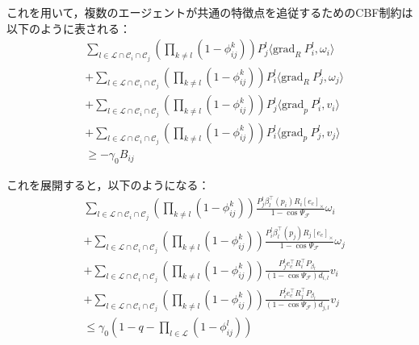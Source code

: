これを用いて，複数のエージェントが共通の特徴点を追従するためのCBF制約は以下のように表される：
\begin{equation}
\begin{aligned}
&\sum_{l \in \mathcal{L} \cap \mathcal{C}_i \cap \mathcal{C}_j}\left(\prod_{k \neq l}(1 - \phi_{ij}^k)\right)P_j^l \langle \mathrm{grad}_R\:P_i^l, \omega_i \rangle \\
&+ \sum_{l \in \mathcal{L} \cap \mathcal{C}_i \cap \mathcal{C}_j}\left(\prod_{k \neq l}(1 - \phi_{ij}^k)\right)P_i^l \langle \mathrm{grad}_R\:P_j^l, \omega_j \rangle \\
&+ \sum_{l \in \mathcal{L} \cap \mathcal{C}_i \cap \mathcal{C}_j}\left(\prod_{k \neq l}(1 - \phi_{ij}^k)\right)P_j^l \langle \mathrm{grad}_p\:P_i^l, v_i \rangle \\
&+ \sum_{l \in \mathcal{L} \cap \mathcal{C}_i \cap \mathcal{C}_j}\left(\prod_{k \neq l}(1 - \phi_{ij}^k)\right)P_i^l \langle \mathrm{grad}_p\:P_j^l, v_j \rangle \\
&\geq -\gamma_0 B_{ij}
\label{eq:common_cbf_constraint}
\end{aligned}
\end{equation}

これを展開すると，以下のようになる：
\begin{equation}
\begin{aligned}
&\sum_{l \in \mathcal{L} \cap \mathcal{C}_i \cap \mathcal{C}_j}\left(\prod_{k \neq l}(1 - \phi_{ij}^k)\right) \frac{P_j^l\beta_l^\top(p_i) R_i [e_c]_\times}{1 - \cos\Psi_\mathcal{F}}\omega_i \\
&+ \sum_{l \in \mathcal{L} \cap \mathcal{C}_i \cap \mathcal{C}_j}\left(\prod_{k \neq l}(1 - \phi_{ij}^k)\right) \frac{P_i^l\beta_l^\top(p_j) R_j [e_c]_\times}{1 - \cos\Psi_\mathcal{F}}\omega_j \\
&+ \sum_{l \in \mathcal{L} \cap \mathcal{C}_i \cap \mathcal{C}_j}\left(\prod_{k \neq l}(1 - \phi_{ij}^k)\right)\frac{P_j^le_c^\top R_i^\top P_{\beta_l}}{(1 - \cos\Psi_\mathcal{F})d_{i,l}}v_i \\
&+ \sum_{l \in \mathcal{L} \cap \mathcal{C}_i \cap \mathcal{C}_j}\left(\prod_{k \neq l}(1 - \phi_{ij}^k)\right)\frac{P_i^le_c^\top R_j^\top P_{\beta_l}}{(1 - \cos\Psi_\mathcal{F})d_{j,l}}v_j \\
&\leq \gamma_0 \left(1 - q - \prod_{l \in \mathcal{L}}(1 - \phi_{ij}^l)\right)
\label{eq:common_cbf_constraint_expanded}
\end{aligned}
\end{equation}

